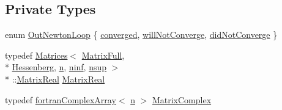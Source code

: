 \subsection*{Private Types}
\begin{DoxyCompactItemize}
\item 
enum \hyperlink{classodes_1_1Radau5cc_a530d53d29f5c75bb20865fb786cd5f2d}{Out\-Newton\-Loop} \{ \hyperlink{classodes_1_1Radau5cc_a530d53d29f5c75bb20865fb786cd5f2da9c86014618b5c6f2e6ce53e385cd80f7}{converged}, 
\hyperlink{classodes_1_1Radau5cc_a530d53d29f5c75bb20865fb786cd5f2dade02d21b4fd6d41fda13e76994c35ea2}{will\-Not\-Converge}, 
\hyperlink{classodes_1_1Radau5cc_a530d53d29f5c75bb20865fb786cd5f2da649d2035432ef689c9c03cdd074a1ded}{did\-Not\-Converge}
 \}
\item 
typedef \hyperlink{classodes_1_1Matrices}{Matrices}$<$ \hyperlink{classodes_1_1Radau5cc_a8e67471bdbf858fff865561d859a066a}{Matrix\-Full}, \\*
\hyperlink{classodes_1_1Radau5cc_ae66683695f55d21d7c11ca7e3323d0e9}{Hessenberg}, \hyperlink{classodes_1_1Radau5cc_a3be3f05d2cdf7268e7d09b62ad9ad494}{n}, \hyperlink{classodes_1_1Radau5cc_ac47e67a43369971eeb08c2d2200a76d5}{ninf}, \hyperlink{classodes_1_1Radau5cc_a4e80b8064e4d8f60262591531fcd1ff0}{nsup} $>$\\*
\-::\hyperlink{classodes_1_1Radau5cc_a8ef067b8852403d48d8528f601a4626a}{Matrix\-Real} \hyperlink{classodes_1_1Radau5cc_a8ef067b8852403d48d8528f601a4626a}{Matrix\-Real}
\item 
typedef \hyperlink{classodes_1_1fortranComplexArray}{fortran\-Complex\-Array}$<$ \hyperlink{classodes_1_1Radau5cc_a3be3f05d2cdf7268e7d09b62ad9ad494}{n} $>$ \hyperlink{classodes_1_1Matrices_aa1313b5ab7fdab6f5320c8d5aa3bfc24}{Matrix\-Complex}
\end{DoxyCompactItemize}
